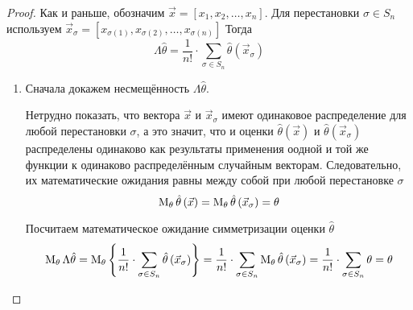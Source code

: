 \begin{proof}
  Как и раньше, обозначим $\vec{x} = \left[ x_1, x_2, \dots, x_n \right]$.
  Для перестановки $\sigma \in S_n$ используем
  $\vec{x}_\sigma = \left[ x_{\sigma\left(1\right)}, x_{\sigma\left(2\right)},
  \dots, x_{\sigma\left(n\right)} \right]$
  Тогда
  \begin{equation*}
    \Lambda\hat{\theta}
    = \frac{1}{n!} \cdot \sum_{\sigma \in S_n}
      \hat{\theta}\left( \vec{x}_{\sigma} \right)
  \end{equation*}

  \begin{enumerate}
    \item
      Сначала докажем несмещённость $\Lambda\hat{\theta}$.

      Нетрудно показать, что  вектора $\vec{x}$ и $\vec{x}_\sigma$
      имеют одинаковое распределение для любой перестановки $\sigma$,
      а это значит, что и оценки $\hat{\theta}\left(\vec{x}\right)$
      и $\hat{\theta}\left(\vec{x}_\sigma\right)$
      распределены одинаково как результаты применения оодной и той же
      функции к одинаково распределённым случайным векторам.
      Следовательно, их математические ожидания равны между собой
      при любой перестановке $\sigma$
      \begin{equation*}
        \operatorname{M}_{\theta} \hat{\theta}\left(\vec{x}\right)
        = \operatorname{M}_{\theta} \hat{\theta}\left(\vec{x}_\sigma\right)
        = \theta
      \end{equation*}

      Посчитаем математическое ожидание симметризации оценки $\hat{\theta}$
      \begin{align*}
        \operatorname{M}_{\theta} \Lambda\hat{\theta}
        = \operatorname{M}_{\theta} \left\{\frac{1}{n!}\cdot \sum_{\sigma\in S_n}
          \hat{\theta}\left( \vec{x}_{\sigma} \right)\right\}
        = \frac{1}{n!} \cdot \sum_{\sigma \in S_n}
          \operatorname{M}_{\theta} \hat{\theta}
            \left( \vec{x}_{\sigma} \right)
        = \frac{1}{n!} \cdot \sum_{\sigma \in S_n} \theta
        = \theta
      \end{align*}
      \begin{comment}
      Помним, что математическое ожидание линейно и
      константы можно выносить за знак математического ожидания,
      а математическое ожидание суммы равно сумме математических ожиданий
      \begin{align*}
          \meanof{\theta}{\left\{\frac{1}{n!}\cdot \sum_{\sigma\in S_n}
        \hat{\theta}\left(\vec{x}_\sigma\right)\right\}}
        = \frac{1}{n!}\cdot \sum_{\sigma\in S_n}
            \meanof{\theta}{\hat{\theta}\left(\vec{x}_\sigma\right)}
      \end{align*}


\end{comment}
\end{enumerate}
\end{proof}
